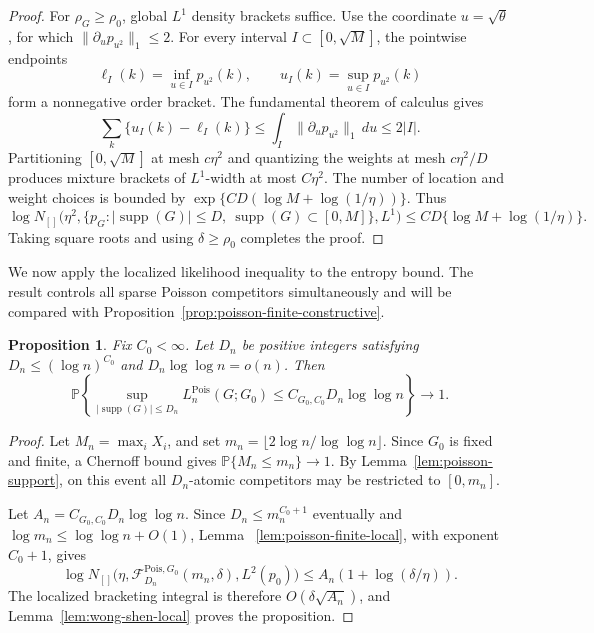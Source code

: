 \documentclass[11pt]{article}
\newtheorem{proposition}[theorem]{Proposition}
\theoremstyle{definition}
\numberwithin{equation}{section}
\DeclareMathOperator{\supp}{supp}
\begin{document}
\begin{proof}
For \(\rho_G\ge\rho_0\), global \(L^1\) density brackets suffice. Use the
coordinate \(u=\sqrt\theta\), for which
\(\|\partial_up_{u^2}\|_1\le2\). For every interval
\(I\subset[0,\sqrt M]\), the pointwise endpoints
\[
 \ell_I(k)=\inf_{u\in I}p_{u^2}(k),
 \qquad u_I(k)=\sup_{u\in I}p_{u^2}(k)
\]
form a nonnegative order bracket. The fundamental theorem of calculus gives
\[
 \sum_k\{u_I(k)-\ell_I(k)\}
 \le\int_I\|\partial_up_{u^2}\|_1\,du\le2|I|.
\]
Partitioning \([0,\sqrt M]\) at mesh \(c\eta^2\) and quantizing the
weights at mesh \(c\eta^2/D\) produces mixture brackets of \(L^1\)-width
at most \(C\eta^2\). The number of location and weight choices is bounded
by \(\exp\{CD(\log M+\log(1/\eta))\}\). Thus
\[
 \log N_{[]}\bigl(\eta^2,
 \{p_G:|\supp(G)|\le D,\ \supp(G)\subset[0,M]\},L^1\bigr)
 \le CD\{\log M+\log(1/\eta)\}.
\]
Taking square roots and using \(\delta\ge\rho_0\) completes the proof.
\end{proof}

We now apply the localized likelihood inequality to the entropy bound. The
result controls all sparse Poisson competitors simultaneously and will be
compared with Proposition~\ref{prop:poisson-finite-constructive}.

\begin{proposition}
\label{prop:poisson-finite-upper}
Fix \(C_0<\infty\). Let \(D_n\) be positive integers satisfying
\(D_n\le(\log n)^{C_0}\) and \(D_n\log\log n=o(n)\). Then
\[
    \mathbb P\left\{
        \sup_{|\supp(G)|\le D_n}L_n^{\mathrm{Pois}}(G;G_0)
        \le C_{G_0,C_0}D_n\log\log n
    \right\}\to1.
\]
\end{proposition}

\begin{proof}
Let \(M_n=\max_iX_i\), and set \(m_n=\lfloor2\log n/\log\log n\rfloor\). Since \(G_0\) is fixed and finite, a Chernoff bound gives \(\mathbb P\{M_n\le m_n\}\to1\). By Lemma~\ref{lem:poisson-support}, on this event all \(D_n\)-atomic competitors may be restricted to \([0,m_n]\).

Let \(A_n=C_{G_0,C_0}D_n\log\log n\). Since
\(D_n\le m_n^{C_0+1}\) eventually and
\(\log m_n\le\log\log n+O(1)\), Lemma
~\ref{lem:poisson-finite-local}, with exponent \(C_0+1\), gives
\[
    \log N_{[]}
    \bigl(
        \eta,
        \mathcal F_{D_n}^{\mathrm{Pois},G_0}(m_n,\delta),
        L^2(p_0)
    \bigr)
    \le
    A_n(1+\log(\delta/\eta)).
\]
The localized bracketing integral is therefore \(O(\delta\sqrt{A_n})\), and Lemma~\ref{lem:wong-shen-local} proves the proposition.
\end{proof}
\end{document}
